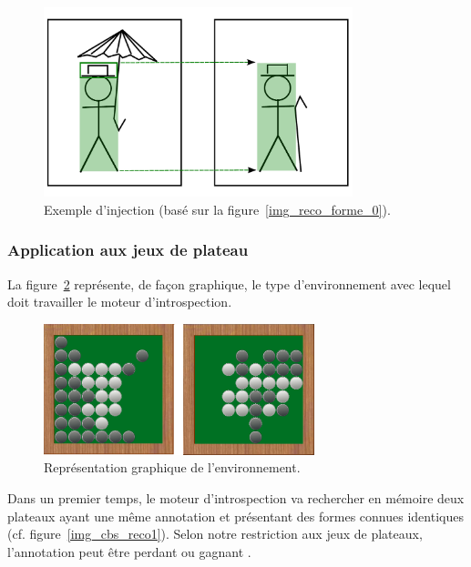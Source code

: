 \begin{figure}[H] 
\begin{center}
\includegraphics[width=0.8\textwidth]{files/raisonneur/reconnaissance_de_formes_injection} 
\end{center}
\caption{Exemple d'injection (basé sur la figure~\ref{img_reco_forme_0}).}
\label{img_reco_forme_injection}
\end{figure}

\subsubsection{Application aux jeux de plateau}

La figure~\ref{img_cbs_reco0} représente, de façon graphique, le type d'environnement avec lequel doit travailler le moteur d'introspection.

\begin{figure}[H] 
\begin{center}
\includegraphics[width=0.7\textwidth]{files/raisonneur/cbs_reco0} 
\end{center}
\caption{Représentation graphique de l'environnement.}
\label{img_cbs_reco0}
\end{figure}

Dans un premier temps, le moteur d'introspection va rechercher en mémoire deux plateaux ayant une même annotation et présentant des formes connues identiques (cf. figure~\ref{img_cbs_reco1}). Selon notre restriction aux jeux de plateaux, l'annotation peut être \og perdant \fg{} ou \og gagnant \fg{}.

